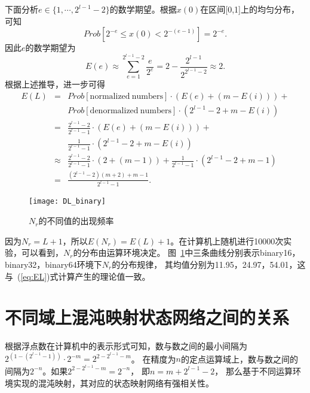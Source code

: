 下面分析$e\in \{1,\cdots ,2^{l-1}-2\}$的数学期望。根据$x(0)$在区间[0,1]上的均匀分布，可知
\begin{equation*}
\mathit{Prob}[2^{-e}\le x(0) < 2^{-(e-1)}]=2^{-e}.
\end{equation*}
因此$e$的数学期望为
\begin{equation*}
E(e)\approx \sum_{e=1}^{2^{l-1}-2} \frac{e}{2^{e}}=2-\frac{2^{l-1}}{2^{2^{l-1}-2}}\approx 2.
\end{equation*}
根据上述推导，进一步可得
\begin{eqnarray}
E(L)
& =       & \mathit{Prob}[\mathrm{normalized\ numbers}]\cdot \left(E(e)+(m-E(i))\right)+\nonumber\\
&         & \mathit{Prob}[\mathrm{denormalized\ numbers}]\cdot \left(2^{l-1}-2+m-E(i)\right)\nonumber\\
& =       & \frac{2^{l-1}-2}{2^{l-1}-1}\cdot \left(E(e)+(m-E(i))\right)+\nonumber\\
&         & \frac{1}{2^{l-1}-1}\cdot \left(2^{l-1}-2+m-E(i)\right)\nonumber\\
& \!\approx\! & \frac{2^{l-1}-2}{2^{l-1}-1}\cdot (2+(m-1))\!+\! \frac{1}{2^{l-1}-1}\cdot (2^{l-1}-2+m-1)\nonumber\\
& =       & \frac{(2^{l-1}-2)(m+2)+m-1}{2^{l-1}-1}.
\label{eq:EL}
\end{eqnarray}

\begin{figure}[!htb]
\centering
\begin{minipage}{1.25\BigOneImW}
\centering
\texttt{[image: DL\_binary]}
\end{minipage}
\caption{$N_r$的不同值的出现频率}
\label{fig:DistributionL_binary}
\end{figure}

因为$N_r=L+1$，所以$E(N_r)=E(L)+1$。在计算机上随机进行10000次实验，可以看到，$N_r$的分布由运算环境决定。
图~\ref{fig:DistributionL_binary}中三条曲线分别表示binary16，binary32，binary64环境下$N_r$的分布规律，
其均值分别为11.95，24.97，54.01，这与~(\ref{eq:EL})式计算产生的理论值一致。

\section{不同域上混沌映射状态网络之间的关系}

根据浮点数在计算机中的表示形式可知，数与数之间的最小间隔为$2^{( 1- (2^{l-1}-1) )} \cdot 2^{-m} = 2^{2-2^{l-1}-m}$。
在精度为$n$的定点运算域上，数与数之间的间隔为$2^{-n}$。如果$2^{2-2^{l-1}-m}=2^{-n}$， 即$n=m+2^{l-1}-2$，
那么基于不同运算环境实现的混沌映射，其对应的状态映射网络有强相关性。

